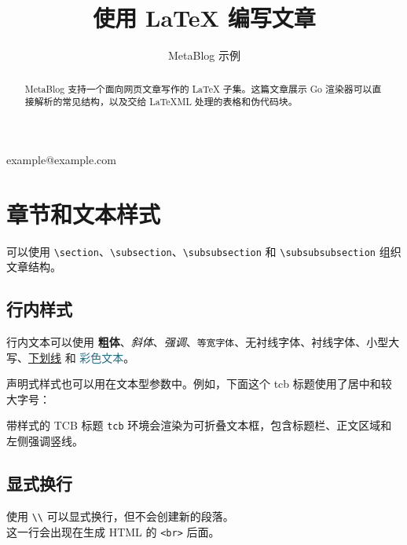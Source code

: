 

\title{使用 LaTeX 编写文章}
\author{MetaBlog 示例}{}{example@example.com}

\begin{abstract}
MetaBlog 支持一个面向网页文章写作的 LaTeX 子集。这篇文章展示 Go 渲染器可以直接解析的常见结构，以及交给 LaTeXML 处理的表格和伪代码块。
\end{abstract}

\section{章节和文本样式}

可以使用 \verb|\section|、\verb|\subsection|、\verb|\subsubsection| 和 \verb|\subsubsubsection| 组织文章结构。

\subsection{行内样式}

行内文本可以使用 \textbf{粗体}、\textit{斜体}、\emph{强调}、\texttt{等宽字体}、\textsf{无衬线字体}、\textrm{衬线字体}、\textsc{小型大写}、\underline{下划线} 和 \textcolor{#256d85}{彩色文本}。

声明式样式也可以用在文本型参数中。例如，下面这个 tcb 标题使用了居中和较大字号：

\begin{tcb}[#e8f3f8][#256d85][#f7fbfd]{\Large\centering 带样式的 TCB 标题}
\texttt{tcb} 环境会渲染为可折叠文本框，包含标题栏、正文区域和左侧强调竖线。
\end{tcb}

\subsection{显式换行}

使用 \verb|\\| 可以显式换行，但不会创建新的段落。\\
这一行会出现在生成 HTML 的 \texttt{<br>} 后面。

